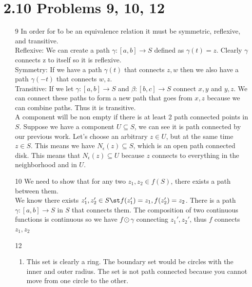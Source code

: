 \documentclass{article}
\begin{document}
  \section{2.10 Problems 9, 10, 12}
  \begin{enumerate}
    \item[9] In order for \~ to be an equivalence relation it must be  symmetric, reflexive, and transitive.\\
      Reflexive: We can create a path $\gamma:[a,b]\to S$ defined as $\gamma(t)=z$. Clearly $\gamma$ connects z to itself so it is reflexive.\\
      Symmetry: If we have a path $\gamma(t)$ that connects $z,w$ then we also have a path $\gamma(-t)$ that connects $w,z$.\\
      Transitive: If we let $\gamma:[a,b]\to S$ and $\beta:[b,c]\to S$ connect $x,y$ and $y,z$. We can connect these paths to form a new path that goes from $x,z$ because we can combine paths. Thus it is transitive.\\
      A component will be non empty if there is at least 2 path connected points in $S$. Suppose we have a component $U\subseteq S$, we can see it is path connected by our previous work. Let's choose an arbitrary $z\in U$, but at the same time $z\in S$. This means we have $N_\epsilon(z)\subseteq S$, which is an open path connected disk. This means that $N_\epsilon(z)\subseteq U$ because $z$ connects to everything in the neighborhood and in $U$.
    \item[10] We need to show that for any two $z_1,z_2\in f(S)$, there  exists a path between them.\\
      We know there exists $z_1',z_2'\in S\st f(z_1')=z_1, f(z_2')=z_2$. There is a path $\gamma:[a,b]\to S$ in $S$ that connects them. The composition of two continuous functions is continuous so we have $f\odot\gamma$ connecting $z_1',z_2'$, thus $f$ connects $z_1,z_2$
    \item[12]
      \begin{enumerate}[label=\roman*]
        \item
          This set is clearly a ring. The boundary set would be   circles with the inner and outer radius. The set is not path connected because you cannot move from one circle to the other.\\

\end{enumerate}
\end{enumerate}
\end{document}
